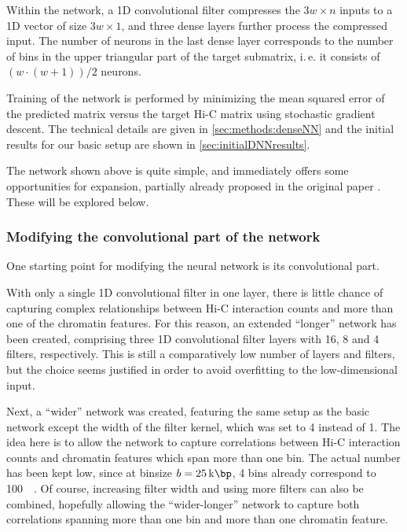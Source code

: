 Within the network, a 1D convolutional filter compresses the $3w \times n$ inputs to a 1D vector
of size $3w \times 1$, and three dense layers further process the compressed input.
The number of neurons in the last dense layer corresponds to the number of bins
in the upper triangular part of the target submatrix, i.\,e. it consists of $(w \cdot (w+1))/2$ neurons.

Training of the network is performed by minimizing the mean squared error of the predicted matrix
versus the target Hi-C matrix using stochastic gradient descent.
The technical details are given in \cref{sec:methods:denseNN}
and the initial results for our basic setup are shown in \cref{sec:initialDNNresults}.

The network shown above is quite simple, and immediately offers some opportunities
for expansion, partially already proposed in the original paper \cite{Farre2018a}.
These will be explored below.

\subsubsection{Modifying the convolutional part of the network}
One starting point for modifying the neural network is its convolutional part.

With only a single 1D convolutional filter in one layer, there is little chance of capturing complex relationships 
between Hi-C interaction counts and more than one of the chromatin features.
For this reason, an extended ``longer'' network has been created, 
comprising three 1D convolutional filter layers with 16, 8 and 4 filters, respectively.
This is still a comparatively low number of layers and filters,
but the choice seems justified in order to avoid overfitting to the low-dimensional input.

Next, a ``wider'' network was created, featuring the same setup as the basic network
except the width of the filter kernel, which was set to 4 instead of 1.
The idea here is to allow the network to capture correlations between Hi-C interaction counts
and chromatin features which span more than one bin. 
The actual number has been kept low, since at binsize $b=\SI{25}{\kilo\bp}$, 4 bins already correspond to \SI{100}{\kilo\bp}.
Of course, increasing filter width and using more filters can also be combined,
hopefully allowing the  ``wider-longer'' network to capture both correlations
spanning more than one bin and more than one chromatin feature.

